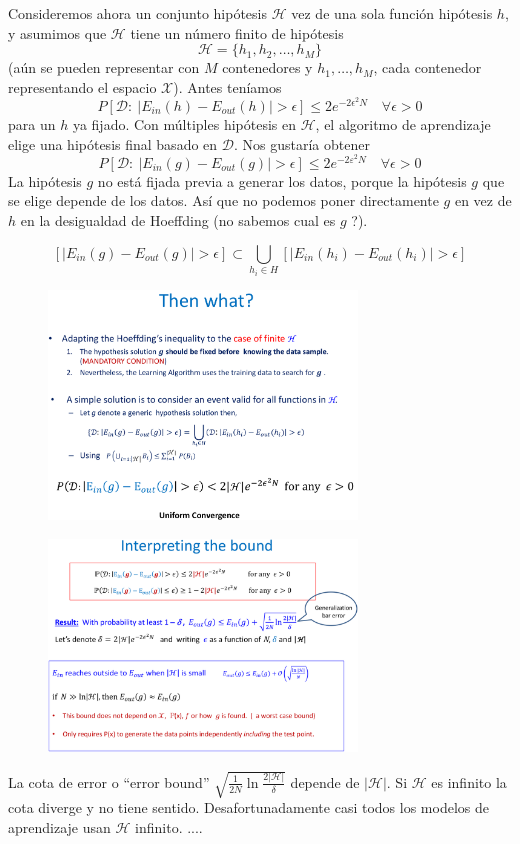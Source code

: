 \documentclass[11pt,a4paper]{article}
\theoremstyle{definition}
\begin{document}
	Consideremos ahora un conjunto hipótesis $\mathcal{H}$ vez de una sola función hipótesis $h$, y asumimos que $\mathcal{H}$ tiene un número finito de hipótesis
	$$\mathcal{H}=\{h_1,h_2,\ldots ,h_M\}$$
	(aún se pueden representar con $M$ contenedores y $h_1,\ldots, h_M$, cada contenedor representando el espacio $\mathcal{X}$). Antes teníamos 
	$$P[\mathcal{D}:\ |E_{in}(h)-E_{out}(h)| > \epsilon ] \leq 2e^{-2\epsilon ^2 N} \quad \forall \epsilon >0$$
	para un $h$ ya fijado. Con múltiples hipótesis en $\mathcal{H}$, el algoritmo de aprendizaje elige una hipótesis final basado en $\mathcal{D}$. Nos gustaría obtener
	$$P[\mathcal{D}:\ |E_{in}(g)-E_{out}(g)|>\epsilon] \leq 2e^{-2\varepsilon ^2 N} \quad \forall \epsilon >0$$
	La hipótesis $g$ no está fijada previa a generar los datos, porque la hipótesis $g$ que se elige depende de los datos. Así que no podemos poner directamente $g$ en vez de $h$ en la desigualdad de Hoeffding (no sabemos cual es $g$ ?).
	
	$$[|E_{in}(g)-E_{out}(g)|>\epsilon] \subset \bigcup_{h_i\in H} [|E_{in}(h_i)-E_{out}(h_i)|>\epsilon]$$
	
	\begin{figure}[H]
		\centering
		\includegraphics[width=0.73\textwidth]{images/then_what}
	\end{figure}
	
	\begin{figure}[H]
		\centering
		\includegraphics[width=0.73\textwidth]{images/interpreting_bound}
	\end{figure}
	La cota de error o ``error bound'' $\sqrt{\frac{1}{2N} \ln \frac{2|\mathcal{H}|}{\delta}}$ depende de $|\mathcal{H}|$. Si $\mathcal{H}$ es infinito la cota diverge y no tiene sentido. Desafortunadamente casi todos los modelos de aprendizaje usan $\mathcal{H}$ infinito.
	....
\end{document}

